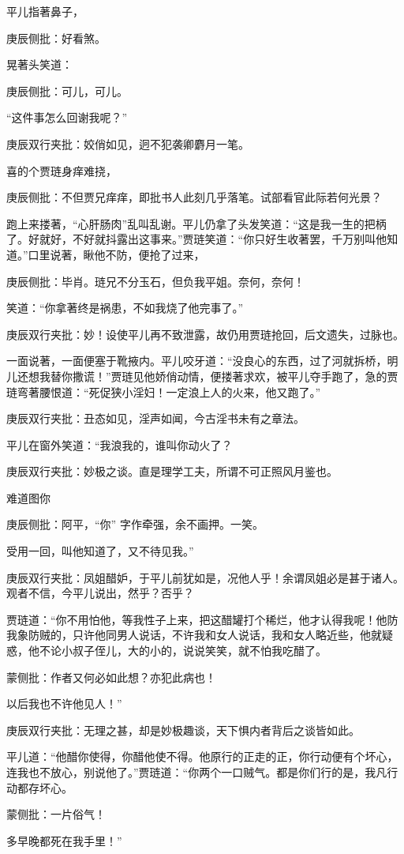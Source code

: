 \begin{parag}
    平儿指著鼻子，\begin{note}庚辰侧批：好看煞。\end{note}晃著头笑道：\begin{note}庚辰侧批：可儿，可儿。\end{note}“这件事怎么回谢我呢？”\begin{note}庚辰双行夹批：姣俏如见，迥不犯袭卿麝月一笔。\end{note}喜的个贾琏身痒难挠，\begin{note}庚辰侧批：不但贾兄痒痒，即批书人此刻几乎落笔。试部看官此际若何光景？\end{note}跑上来搂著，“心肝肠肉”乱叫乱谢。平儿仍拿了头发笑道：“这是我一生的把柄了。好就好，不好就抖露出这事来。”贾琏笑道：“你只好生收著罢，千万别叫他知道。”口里说著，瞅他不防，便抢了过来，\begin{note}庚辰侧批：毕肖。琏兄不分玉石，但负我平姐。奈何，奈何！\end{note}笑道：“你拿著终是祸患，不如我烧了他完事了。”\begin{note}庚辰双行夹批：妙！设使平儿再不致泄露，故仍用贾琏抢回，后文遗失，过脉也。\end{note}一面说著，一面便塞于靴掖内。平儿咬牙道：“没良心的东西，过了河就拆桥，明儿还想我替你撒谎！”贾琏见他娇俏动情，便搂著求欢，被平儿夺手跑了，急的贾琏弯著腰恨道：“死促狭小淫妇！一定浪上人的火来，他又跑了。”\begin{note}庚辰双行夹批：丑态如见，淫声如闻，今古淫书未有之章法。\end{note}平儿在窗外笑道：“我浪我的，谁叫你动火了？\begin{note}庚辰双行夹批：妙极之谈。直是理学工夫，所谓不可正照风月鉴也。\end{note}难道图你\begin{note}庚辰侧批：阿平，“你” 字作牵强，余不画押。一笑。\end{note}受用一回，叫他知道了，又不待见我。”\begin{note}庚辰双行夹批：凤姐醋妒，于平儿前犹如是，况他人乎！余谓凤姐必是甚于诸人。观者不信，今平儿说出，然乎？否乎？\end{note}贾琏道：“你不用怕他，等我性子上来，把这醋罐打个稀烂，他才认得我呢！他防我象防贼的，只许他同男人说话，不许我和女人说话，我和女人略近些，他就疑惑，他不论小叔子侄儿，大的小的，说说笑笑，就不怕我吃醋了。\begin{note}蒙侧批：作者又何必如此想？亦犯此病也！\end{note}以后我也不许他见人！”\begin{note}庚辰双行夹批：无理之甚，却是妙极趣谈，天下惧内者背后之谈皆如此。\end{note}平儿道：“他醋你使得，你醋他使不得。他原行的正走的正，你行动便有个坏心，连我也不放心，别说他了。”贾琏道：“你两个一口贼气。都是你们行的是，我凡行动都存坏心。\begin{note}蒙侧批：一片俗气！\end{note}多早晚都死在我手里！”
\end{parag}


